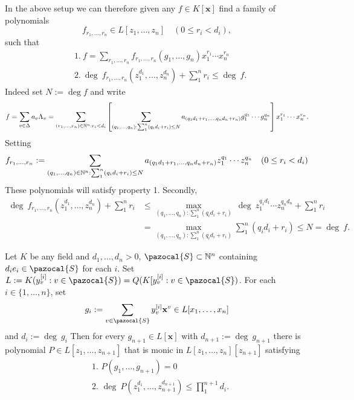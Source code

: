     \begin{remark}
        In the above setup we can therefore given any $f\in K[\mathbf{x}]$ find a family of polynomials 
        $$f_{r_1,\dots,r_n}\in L[z_1,\dots,z_n] \quad (0\leq r_i < d_i),$$
        such that
        \begin{align*}
            &\text{1.}\ f = \sum_{r_1,\dots,r_n} f_{r_1,\dots,r_n}(g_1,\dots,g_n)x_1^{r_1}\cdots x_n^{r_n}\\
            &\text{2.}\ \deg\ f_{r_1,\dots,r_n}(z_1^{d_1},\dots,z_n^{d_n})+\sum_1^n r_i\leq \deg\ f.
        \end{align*}
        Indeed set $N:=\deg f$ and write 
        $$
            f = \sum_{v\in \Delta} a_v\Lambda_v = \sum_{(r_1,\dots,r_n)\in \mathbb{N}^n: r_i<d_i} \left[\sum_{(q_1,\dots,q_n): \sum_1^n (q_id_i+r_i)\leq N} a_{(q_1d_1+r_1,\dots,q_nd_n+r_n)}g_1^{q_1}\cdots g_n^{q_n}\right]x_1^{r_1}\cdots x_n^{r_n}.
        $$
        Setting 
        $$
            f_{r_1,\dots,r_n} := \sum_{(q_1,\dots,q_n)\in \mathbb{N}^n : \sum_1^n (q_id_i+r_i)\leq N} a_{(q_1d_1+r_1,\dots,q_nd_n+r_n)} z_1^{q_1}\cdots z_n^{q_n} \quad (0\leq r_i< d_i)
        $$
        These polynomials will satisfy property 1. Secondly,
        \begin{align*}
            \deg\ f_{r_1,\dots,r_n}(z_1^{d_1},\dots,z_n^{d_n})+\sum_1^n r_i &\leq \max_{(q_1,\dots,q_n) : \sum_1^n (q_id_i+r_i)} \ \deg \ z_1^{q_1d_1}\cdots z_n^{q_nd_n} + \sum_1^n r_i\\
            &= \max_{(q_1,\dots,q_n) : \sum_1^n (q_id_i+r_i)} \sum_1^n (q_id_i+r_i) \leq N = \deg \ f.
        \end{align*}
    \end{remark}
    \begin{lemma}\label{PerronInSpecialCase}
        Let $K$ be any field and $d_1,\dots,d_n>0$, $\pazocal{S}\subset \N^n$ containing $d_ie_i\in \pazocal{S}$ for each $i$. Set $L := K(y_v^{[i]} : v\in \pazocal{S})= Q(K[y_v^{[i]} : v \in \pazocal{S})$. For each $i\in \{1,\dots,n\}$, set 
        $$g_i := \sum_{v\in\pazocal{S}} y_v^{[i]}\mathbf{x}^v \in L[x_1,\dots,x_n]$$
        and $d_i := \deg\ g_i$ Then for every $g_{n+1}\in L[\mathbf{x}]$ with $d_{n+1} := \deg \ g_{n+1}$ there is polynomial $P\in L[z_1,\dots,z_{n+1}]$ that is monic in $L[z_1,\dots,z_n][z_{n+1}]$ satisfying 
            \begin{align*}
                &\text{1. } P(g_1,\dots,g_{n+1})=0\\
                &\text{2. } \deg \ P(z_1^{d_1},\dots,z_{n+1}^{d_{n+1}}) \leq \prod_1^{n+1}d_i.
            \end{align*}    
    \end{lemma}
